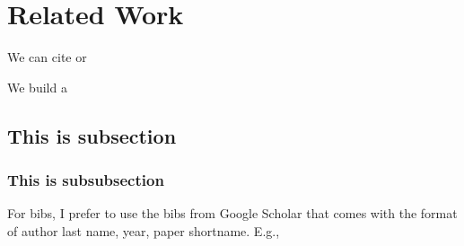 \section{Related Work}


We can cite \tmpcite{} or \cite{ma2025dbox}

We build a \sys{}



\subsection{This is subsection}
\subsubsection{This is subsubsection}

For bibs, I prefer to use the bibs from Google Scholar that comes with the format of author last name, year, paper shortname. E.g., \cite{ma2025dbox}